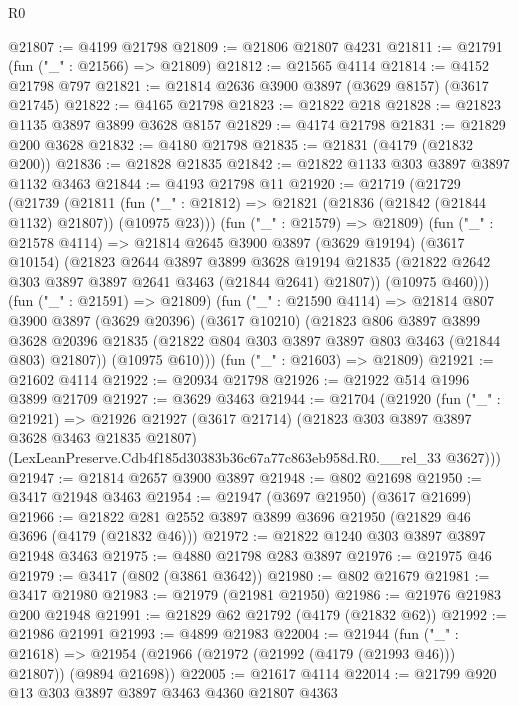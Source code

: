 \begin{lexlean}{R0}
\begin{coremodule}
@21807 := @4199 @21798
@21809 := @21806 @21807 @4231
@21811 := @21791 (fun ("_" : @21566) => @21809)
@21812 := @21565 @4114
@21814 := @4152 @21798 @797
@21821 := @21814 @2636 @3900 @3897 (@3629 @8157) (@3617 @21745)
@21822 := @4165 @21798
@21823 := @21822 @218
@21828 := @21823 @1135 @3897 @3899 @3628 @8157
@21829 := @4174 @21798
@21831 := @21829 @200 @3628
@21832 := @4180 @21798
@21835 := @21831 (@4179 (@21832 @200))
@21836 := @21828 @21835
@21842 := @21822 @1133 @303 @3897 @3897 @1132 @3463
@21844 := @4193 @21798 @11
@21920 := @21719
    (@21729
      (@21739
        (@21811 (fun ("_" : @21812) => @21821 (@21836 (@21842 (@21844 @1132) @21807)) (@10975 @23)))
        (fun ("_" : @21579) => @21809)
        (fun ("_" : @21578 @4114) =>
        @21814
          @2645
          @3900
          @3897
          (@3629 @19194)
          (@3617 @10154)
          (@21823
            @2644
            @3897
            @3899
            @3628
            @19194
            @21835
            (@21822 @2642 @303 @3897 @3897 @2641 @3463 (@21844 @2641) @21807))
          (@10975 @460)))
      (fun ("_" : @21591) => @21809)
      (fun ("_" : @21590 @4114) =>
      @21814
        @807
        @3900
        @3897
        (@3629 @20396)
        (@3617 @10210)
        (@21823
          @806
          @3897
          @3899
          @3628
          @20396
          @21835
          (@21822 @804 @303 @3897 @3897 @803 @3463 (@21844 @803) @21807))
        (@10975 @610)))
    (fun ("_" : @21603) => @21809)
@21921 := @21602 @4114
@21922 := @20934 @21798
@21926 := @21922 @514 @1996 @3899 @21709
@21927 := @3629 @3463
@21944 := @21704
    (@21920
      (fun ("_" : @21921) =>
      @21926
        @21927
        (@3617 @21714)
        (@21823 @303 @3897 @3897 @3628 @3463 @21835 @21807)
        (LexLeanPreserve.Cdb4f185d30383b36c67a77c863eb958d.R0.__rel_33 @3627)))
@21947 := @21814 @2657 @3900 @3897
@21948 := @802 @21698
@21950 := @3417 @21948 @3463
@21954 := @21947 (@3697 @21950) (@3617 @21699)
@21966 := @21822 @281 @2552 @3897 @3899 @3696 @21950 (@21829 @46 @3696 (@4179 (@21832 @46)))
@21972 := @21822 @1240 @303 @3897 @3897 @21948 @3463
@21975 := @4880 @21798 @283 @3897
@21976 := @21975 @46
@21979 := @3417 (@802 (@3861 @3642))
@21980 := @802 @21679
@21981 := @3417 @21980
@21983 := @21979 (@21981 @21950)
@21986 := @21976 @21983 @200 @21948
@21991 := @21829 @62 @21792 (@4179 (@21832 @62))
@21992 := @21986 @21991
@21993 := @4899 @21983
@22004 := @21944
    (fun ("_" : @21618) =>
    @21954 (@21966 (@21972 (@21992 (@4179 (@21993 @46))) @21807)) (@9894 @21698))
@22005 := @21617 @4114
@22014 := @21799 @920 @13 @303 @3897 @3897 @3463 @4360 @21807 @4363

\end{coremodule}
\end{lexlean}
